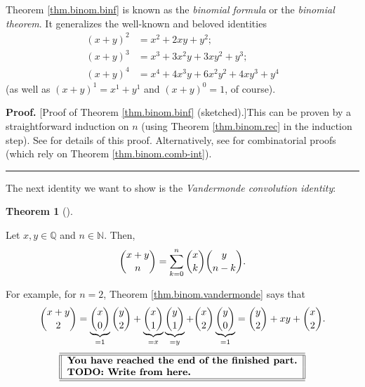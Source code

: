 \documentclass[numbers=enddot,12pt,final,onecolumn,notitlepage]{scrartcl}%
\numberwithin{exer}{subsection}
\theoremstyle{definition}
\newtheorem{theo}{Theorem}[subsection]
\newenvironment{theorem}[1][]
{\begin{theo}[#1]\begin{leftbar}}
{\end{leftbar}\end{theo}}
\newenvironment{proof}[1][Proof]{\noindent\textbf{#1.} }{\ \rule{0.5em}{0.5em}}
\let\sumnonlimits\sum
\renewcommand{\sum}{\sumnonlimits\limits}
\begin{document}
Theorem \ref{thm.binom.binf} is known as the \textit{binomial formula} or the
\textit{binomial theorem}. It generalizes the well-known and beloved
identities%
\begin{align*}
\left(  x+y\right)  ^{2}  &  =x^{2}+2xy+y^{2};\\
\left(  x+y\right)  ^{3}  &  =x^{3}+3x^{2}y+3xy^{2}+y^{3};\\
\left(  x+y\right)  ^{4}  &  =x^{4}+4x^{3}y+6x^{2}y^{2}+4xy^{3}+y^{4}%
\end{align*}
(as well as $\left(  x+y\right)  ^{1}=x^{1}+y^{1}$ and $\left(  x+y\right)
^{0}=1$, of course).

\begin{proof}
[Proof of Theorem \ref{thm.binom.binf} (sketched).]This can be proven by a
straightforward induction on $n$ (using Theorem \ref{thm.binom.rec} in the
induction step). See \cite[Exercise 3.6]{detnotes} for details of this proof.
Alternatively, see \cite[Identity 11.4]{Galvin} for combinatorial proofs
(which rely on Theorem \ref{thm.binom.comb-int}).
\end{proof}

The next identity we want to show is the \textit{Vandermonde convolution
identity}:

\begin{theorem}
\label{thm.binom.vandermonde}Let $x,y\in\mathbb{Q}$ and $n\in\mathbb{N}$.
Then,%
\[
\dbinom{x+y}{n}=\sum_{k=0}^{n}\dbinom{x}{k}\dbinom{y}{n-k}.
\]

\end{theorem}

For example, for $n=2$, Theorem \ref{thm.binom.vandermonde} says that
\[
\dbinom{x+y}{2}=\underbrace{\dbinom{x}{0}}_{=1}\dbinom{y}{2}%
+\underbrace{\dbinom{x}{1}}_{=x}\underbrace{\dbinom{y}{1}}_{=y}+\dbinom{x}%
{2}\underbrace{\dbinom{y}{0}}_{=1}=\dbinom{y}{2}+xy+\dbinom{x}{2}.
\]%
\[%
\begin{tabular}
[c]{||l||}\hline\hline
\textbf{You have reached the end of the finished part.}\\
\textbf{TODO: Write from here.}\\\hline\hline
\end{tabular}
\]
\end{document}
